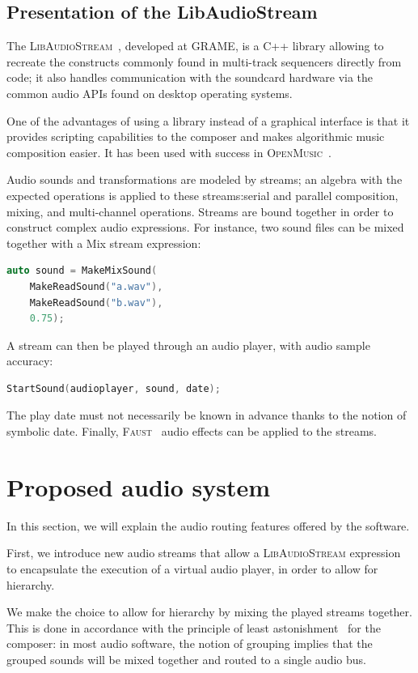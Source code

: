\documentclass{article}
\newcommand*{\LibAudioStream}{\textsc{LibAudioStream}\xspace}
\newcommand*{\openmusic}{\textsc{OpenMusic}\xspace}
\newcommand*{\faust}{\textsc{Faust}\xspace}
\begin{document}
\subsection{Presentation of the LibAudioStream}
The \LibAudioStream~\cite{letzlibaudiostream}, developed at GRAME, is a C++ library allowing to recreate the constructs commonly found in multi-track sequencers directly from code; it also handles communication with the soundcard hardware via the common audio APIs found on desktop operating systems.

One of the advantages of using a library instead of a graphical interface is that it provides scripting capabilities to the composer and makes algorithmic music composition easier.
It has been used with success in \openmusic~\cite{bouche2014programmation}.

Audio sounds and transformations are modeled by streams; an algebra with the expected operations is applied to these streams:serial and parallel composition, mixing, and multi-channel operations.
Streams are bound together in order to construct complex audio expressions.
For instance, two sound files can be mixed together with a Mix stream expression: 
\begin{lstlisting}[language=C++,columns=fullflexible,basicstyle=\ttfamily]
auto sound = MakeMixSound(
    MakeReadSound("a.wav"), 
    MakeReadSound("b.wav"), 
    0.75);
\end{lstlisting}
A stream can then be played through an audio player, with audio sample accuracy:
 
\begin{lstlisting}[language=C++,columns=fullflexible,basicstyle=\ttfamily]
StartSound(audioplayer, sound, date);
\end{lstlisting}

The play date must not necessarily be known in advance thanks to the notion of symbolic date.
Finally, \faust~\cite{orlarey2009faust} audio effects can be applied to the streams.

\section{Proposed audio system}
In this section, we will explain the audio routing 
features offered by the software.

First, we introduce new audio streams that allow a \LibAudioStream
expression to encapsulate the execution of a virtual audio player, 
in order to allow for hierarchy.

We make the choice to allow for hierarchy by mixing the played streams together.
This is done in accordance with the principle of least astonishment~\cite{seebach2001cranky} for the composer: 
in most audio software, the notion of grouping implies that the grouped sounds will be mixed 
together and routed to a single audio bus.
\end{document}

